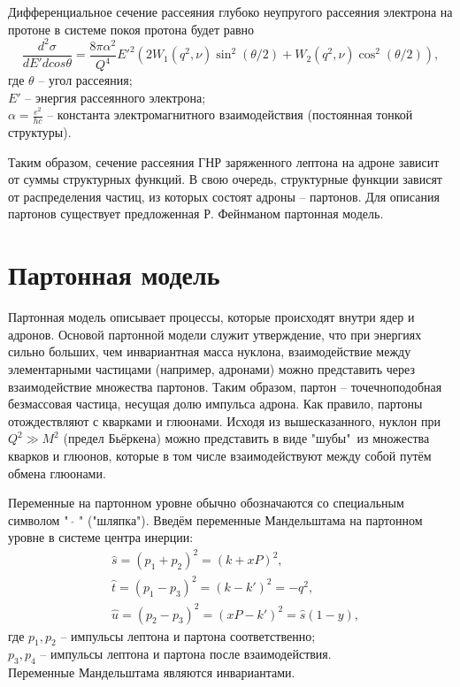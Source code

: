 \documentclass{extreport}
\begin{document}
Дифференциальное сечение рассеяния глубоко неупругого рассеяния электрона на протоне в системе покоя протона будет равно
\begin{equation}
	\frac{d^2\sigma}{dE' d cos\theta} = \frac{8\pi \alpha^2}{Q^4} E'^2 (2W_1(q^2, \nu) \sin^2 (\theta /2) + W_2 (q^2, \nu) \cos^2 (\theta/2)),
\end{equation}
где $\theta$ -- угол рассеяния; \\ $E'$ -- энергия рассеянного электрона; \\ $\alpha = \frac{e^2}{hc}$ -- константа электромагнитного взаимодействия (постоянная тонкой структуры).

Таким образом, сечение рассеяния ГНР заряженного лептона на адроне зависит от суммы структурных функций. В свою очередь, структурные функции зависят от распределения частиц, из которых состоят адроны -- партонов. Для описания партонов существует предложенная Р. Фейнманом партонная модель.
 
\newpage
\chapter{Партонная модель}
\thispagestyle{myheadings}
Партонная модель описывает процессы, которые происходят внутри ядер и адронов. Основой партонной модели служит утверждение, что при энергиях сильно больших, чем инвариантная масса нуклона, взаимодействие между элементарными частицами (например, адронами) можно представить через взаимодействие множества партонов. Таким образом, партон -- точечноподобная безмассовая частица, несущая долю импульса адрона. Как правило, партоны отождествляют с кварками и глюонами. 
Исходя из вышесказанного, нуклон при $Q^2 \gg M^2$ (предел Бьёркена) можно представить в виде "шубы"\ из множества кварков и глюонов, которые в том числе взаимодействуют между собой путём обмена глюонами.


Переменные на партонном уровне обычно обозначаются со специальным символом "\ $\hat{}$ " ("шляпка"). Введём переменные Мандельштама на партонном уровне в системе центра инерции:
\begin{equation}
\begin{split}
	& \hat{s} = (p_1+p_2)^2 = (k + xP)^2, \\
	& \hat{t} = (p_1-p_3)^2 = (k-k')^2 = -q^2, \\
	& \hat{u} = (p_2-p_3)^2 =(xP-k')^2= \hat{s} (1-y),
\end{split}
\end{equation}
где $p_1, p_2$ -- импульсы лептона и партона соответственно; \\ $p_3, p_4$ -- импульсы лептона и партона после взаимодействия. \\
Переменные Мандельштама являются инвариантами. 
\end{document}
